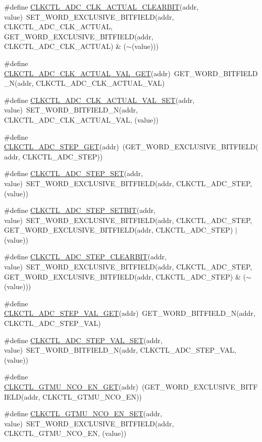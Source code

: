\begin{DoxyCompactItemize}
\item 
\#define \hyperlink{a00544_a0307b161ecd92b0a39e0df297fc436e6}{CLKCTL\_\-ADC\_\-CLK\_\-ACTUAL\_\-CLEARBIT}(addr, value)~SET\_\-WORD\_\-EXCLUSIVE\_\-BITFIELD(addr, CLKCTL\_\-ADC\_\-CLK\_\-ACTUAL, GET\_\-WORD\_\-EXCLUSIVE\_\-BITFIELD(addr, CLKCTL\_\-ADC\_\-CLK\_\-ACTUAL) \& ($\sim$(value)))
\item 
\#define \hyperlink{a00544_a51addc3236e1459615597cf1a219e621}{CLKCTL\_\-ADC\_\-CLK\_\-ACTUAL\_\-VAL\_\-GET}(addr)~GET\_\-WORD\_\-BITFIELD\_\-N(addr, CLKCTL\_\-ADC\_\-CLK\_\-ACTUAL\_\-VAL)
\item 
\#define \hyperlink{a00544_adb4f93b99d77f710932c3a77e34ce0fb}{CLKCTL\_\-ADC\_\-CLK\_\-ACTUAL\_\-VAL\_\-SET}(addr, value)~SET\_\-WORD\_\-BITFIELD\_\-N(addr, CLKCTL\_\-ADC\_\-CLK\_\-ACTUAL\_\-VAL, (value))
\item 
\#define \hyperlink{a00544_ab6c4931193723e01ac89e48ee741c8a1}{CLKCTL\_\-ADC\_\-STEP\_\-GET}(addr)~(GET\_\-WORD\_\-EXCLUSIVE\_\-BITFIELD(addr, CLKCTL\_\-ADC\_\-STEP))
\item 
\#define \hyperlink{a00544_a045fa93282829843563148161622a3dd}{CLKCTL\_\-ADC\_\-STEP\_\-SET}(addr, value)~SET\_\-WORD\_\-EXCLUSIVE\_\-BITFIELD(addr, CLKCTL\_\-ADC\_\-STEP, (value))
\item 
\#define \hyperlink{a00544_abf3f7dc79a4c5aba43ce20b0baef27a7}{CLKCTL\_\-ADC\_\-STEP\_\-SETBIT}(addr, value)~SET\_\-WORD\_\-EXCLUSIVE\_\-BITFIELD(addr, CLKCTL\_\-ADC\_\-STEP, GET\_\-WORD\_\-EXCLUSIVE\_\-BITFIELD(addr, CLKCTL\_\-ADC\_\-STEP) $|$ (value))
\item 
\#define \hyperlink{a00544_a277911272666578ea2e2f1976ce4b530}{CLKCTL\_\-ADC\_\-STEP\_\-CLEARBIT}(addr, value)~SET\_\-WORD\_\-EXCLUSIVE\_\-BITFIELD(addr, CLKCTL\_\-ADC\_\-STEP, GET\_\-WORD\_\-EXCLUSIVE\_\-BITFIELD(addr, CLKCTL\_\-ADC\_\-STEP) \& ($\sim$(value)))
\item 
\#define \hyperlink{a00544_a41bb33dfa1eeb2b066ef7f43c3589ef8}{CLKCTL\_\-ADC\_\-STEP\_\-VAL\_\-GET}(addr)~GET\_\-WORD\_\-BITFIELD\_\-N(addr, CLKCTL\_\-ADC\_\-STEP\_\-VAL)
\item 
\#define \hyperlink{a00544_a73d09b63005e13feccb410c0bcda63ea}{CLKCTL\_\-ADC\_\-STEP\_\-VAL\_\-SET}(addr, value)~SET\_\-WORD\_\-BITFIELD\_\-N(addr, CLKCTL\_\-ADC\_\-STEP\_\-VAL, (value))
\item 
\#define \hyperlink{a00544_a32794a6c15b9a602d74ea6d6c4e35c93}{CLKCTL\_\-GTMU\_\-NCO\_\-EN\_\-GET}(addr)~(GET\_\-WORD\_\-EXCLUSIVE\_\-BITFIELD(addr, CLKCTL\_\-GTMU\_\-NCO\_\-EN))
\item 
\#define \hyperlink{a00544_aa4f30673bfd3e8ab38b7d3663a214669}{CLKCTL\_\-GTMU\_\-NCO\_\-EN\_\-SET}(addr, value)~SET\_\-WORD\_\-EXCLUSIVE\_\-BITFIELD(addr, CLKCTL\_\-GTMU\_\-NCO\_\-EN, (value))

\end{DoxyCompactItemize}
